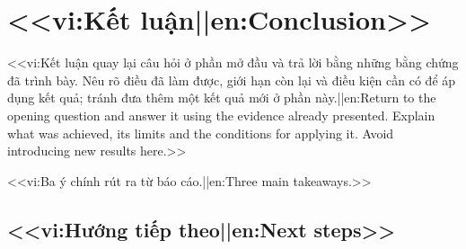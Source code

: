 \chapter{<<vi:Kết luận||en:Conclusion>>}
\label{ch:conclusion}
<<vi:Kết luận quay lại câu hỏi ở phần mở đầu và trả lời bằng những bằng chứng đã trình bày. Nêu rõ điều đã làm được, giới hạn còn lại và điều kiện cần có để áp dụng kết quả; tránh đưa thêm một kết quả mới ở phần này.||en:Return to the opening question and answer it using the evidence already presented. Explain what was achieved, its limits and the conditions for applying it. Avoid introducing new results here.>>

\begin{summary}
<<vi:Ba ý chính rút ra từ báo cáo.||en:Three main takeaways.>>
\end{summary}

\section{<<vi:Hướng tiếp theo||en:Next steps>>}
